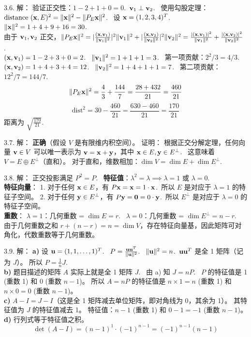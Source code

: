 \begin{exer}
3.6. 解：
验证正交性：$1 - 2 + 1 + 0 = 0$.~$\mathbf{v}_1 \perp \mathbf{v}_2$.~
使用勾股定理：$\text{distance }(\mathbf{x}, E)^2 = \|\mathbf{x}\|^2 - \|P_E \mathbf{x}\|^2$.~
设 $\mathbf{x} = (1, 2, 3, 4)^T$.~
$\|\mathbf{x}\|^2 = 1 + 4 + 9 + 16 = 30$.~
\\
由于 $\mathbf{v}_1, \mathbf{v}_2$ 正交，$\|P_E \mathbf{x}\|^2 = |\frac{(\mathbf{x}, \mathbf{v}_1)}{\|\mathbf{v}_1\|^2}|^2 \|\mathbf{v}_1\|^2 + |\frac{(\mathbf{x}, \mathbf{v}_2)}{\|\mathbf{v}_2\|^2}|^2 \|\mathbf{v}_2\|^2 = \frac{|(\mathbf{x}, \mathbf{v}_1)|^2}{\|\mathbf{v}_1\|^2} + \frac{|(\mathbf{x}, \mathbf{v}_2)|^2}{\|\mathbf{v}_2\|^2}$.~
\\
$(\mathbf{x}, \mathbf{v}_1) = 1 - 2 + 3 + 0 = 2$.~ $\|\mathbf{v}_1\|^2 = 1+1+1=3$.~
第一项贡献：$2^2 / 3 = 4/3$.~
\\
$(\mathbf{x}, \mathbf{v}_2) = 1 + 4 + 3 + 4 = 12$.~ $\|\mathbf{v}_2\|^2 = 1+4+1+1=7$.~
第二项贡献：$12^2 / 7 = 144/7$.~
$$ \|P_E \mathbf{x}\|^2 = \frac{4}{3} + \frac{144}{7} = \frac{28 + 432}{21} = \frac{460}{21} $$
$$ \text{dist}^2 = 30 - \frac{460}{21} = \frac{630 - 460}{21} = \frac{170}{21} $$
距离为 $\sqrt{\frac{170}{21}}$.~

3.7. 解：
\textbf{正确}（假设 $V$ 是有限维内积空间）。
证明：
根据正交分解定理，任何向量 $\mathbf{v} \in V$ 可以唯一表示为 $\mathbf{v} = \mathbf{x} + \mathbf{y}$，其中 $\mathbf{x} \in E, \mathbf{y} \in E^\perp$.~
这意味着 $V = E \oplus E^\perp$（直和）。
对于直和，维数相加：$\dim V = \dim E + \dim E^\perp$.~

3.8. 解：
正交投影满足 $P^2 = P$.~
\textbf{特征值}：$\lambda^2 = \lambda \implies \lambda = 1$ 或 $\lambda = 0$.~\\
\textbf{特征向量}：
1. 对于任何 $\mathbf{x} \in E$，有 $P\mathbf{x} = \mathbf{x} = 1\cdot \mathbf{x}$.~所以 $E$ 是对应于 $\lambda = 1$ 的特征子空间。
2. 对于任何 $\mathbf{y} \in E^\perp$，有 $P\mathbf{y} = \mathbf{0} = 0\cdot \mathbf{y}$.~所以 $E^\perp$ 是对应于 $\lambda = 0$ 的特征子空间。
\\
\textbf{重数}：
 $\lambda = 1$：几何重数 = $\dim E = r$.~
 $\lambda = 0$：几何重数 = $\dim E^\perp = n - r$.~
由于几何重数之和 $r + (n-r) = n = \dim V$，存在特征向量基，因此矩阵可对角化，代数重数等于几何重数。

3.9. 解：
\textbf{a)} 设 $\mathbf{u} = (1, 1, \dots, 1)^T$.~
$P = \frac{\mathbf{u} \mathbf{u}^T}{\|\mathbf{u}\|^2}$.~
$\|\mathbf{u}\|^2 = n$.~$\mathbf{u} \mathbf{u}^T$ 是全 1 矩阵（记为 $J$）。
所以 $P = \frac{1}{n} J$.~
\\
\textbf{b)} 题目描述的矩阵 $A$ 实际上就是全 1 矩阵 $J$.~
由 a) 知 $J = nP$.~
$P$ 的特征值是 1 (重数 1) 和 0 (重数 $n-1$)。
所以 $A = nP$ 的特征值是 $n \times 1 = n$ (重数 1) 和 $n \times 0 = 0$ (重数 $n-1$)。
\\
\textbf{c)} $A - I = J - I$（这是全 1 矩阵减去单位矩阵，即对角线为 0，其余为 1）。
其特征值为 $J$ 的特征值减去 1。
特征值：$n - 1$ (重数 1) 和 $0 - 1 = -1$ (重数 $n-1$)。
\\
\textbf{d)} 行列式等于特征值之积。
$$ \det(A - I) = (n - 1)^1 \cdot (-1)^{n-1} = (-1)^{n-1}(n - 1) $$


\end{exer}
